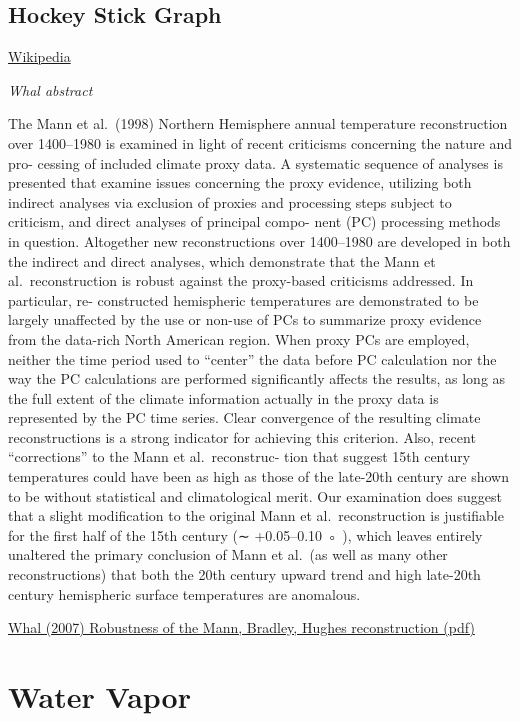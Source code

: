 \documentclass[
]{book}
\begin{document}
\hypertarget{hockey-stick-graph}{%
\section{Hockey Stick Graph}\label{hockey-stick-graph}}

\href{https://en.wikipedia.org/wiki/Hockey_stick_graph}{Wikipedia}

\emph{Whal abstract}

The Mann et al.~(1998) Northern Hemisphere annual temperature reconstruction
over 1400--1980 is examined in light of recent criticisms concerning the nature and pro-
cessing of included climate proxy data. A systematic sequence of analyses is presented that
examine issues concerning the proxy evidence, utilizing both indirect analyses via exclusion
of proxies and processing steps subject to criticism, and direct analyses of principal compo-
nent (PC) processing methods in question. Altogether new reconstructions over 1400--1980
are developed in both the indirect and direct analyses, which demonstrate that the Mann et
al.~reconstruction is robust against the proxy-based criticisms addressed. In particular, re-
constructed hemispheric temperatures are demonstrated to be largely unaffected by the use
or non-use of PCs to summarize proxy evidence from the data-rich North American region.
When proxy PCs are employed, neither the time period used to ``center'' the data before PC
calculation nor the way the PC calculations are performed significantly affects the results,
as long as the full extent of the climate information actually in the proxy data is represented
by the PC time series. Clear convergence of the resulting climate reconstructions is a strong
indicator for achieving this criterion. Also, recent ``corrections'' to the Mann et al.~reconstruc-
tion that suggest 15th century temperatures could have been as high as those of the late-20th
century are shown to be without statistical and climatological merit. Our examination does
suggest that a slight modification to the original Mann et al.~reconstruction is justifiable for
the first half of the 15th century (∼ +0.05--0.10 ◦ ), which leaves entirely unaltered the primary
conclusion of Mann et al.~(as well as many other reconstructions) that both the 20th century
upward trend and high late-20th century hemispheric surface temperatures are anomalous.

\href{pdf/Wahl_2007_Robustness_of_Mann.pdf}{Whal (2007) Robustness of the Mann, Bradley, Hughes reconstruction (pdf)}

\hypertarget{water-vapor}{%
\chapter{Water Vapor}\label{water-vapor}}
\end{document}

